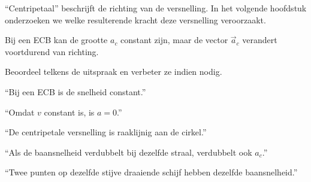 \documentclass{ximera}
\begin{document}
\begin{opmerking}

``Centripetaal'' beschrijft de richting van de versnelling. In het
volgende hoofdstuk onderzoeken we welke resulterende kracht deze
versnelling veroorzaakt.

\end{opmerking}

\begin{opmerking}

Bij een ECB kan de grootte $a_c$ constant zijn, maar de vector
$\vec a_c$ verandert voortdurend van richting.

\end{opmerking}


\begin{oefening}{\oefU\ESS}

Beoordeel telkens de uitspraak en verbeter ze indien nodig.

\begin{question}
``Bij een ECB is de snelheid constant.''
\end{question}

\begin{question}
``Omdat $v$ constant is, is $a=0$.''
\end{question}

\begin{question}
``De centripetale versnelling is raaklijnig aan de cirkel.''
\end{question}

\begin{question}
``Als de baansnelheid verdubbelt bij dezelfde straal, verdubbelt ook
$a_c$.''
\end{question}

\begin{question}
``Twee punten op dezelfde stijve draaiende schijf hebben dezelfde
baansnelheid.''
\end{question}

\end{oefening}



\end{document}
